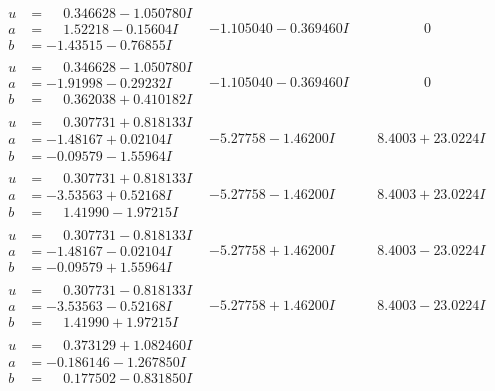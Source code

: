 \documentclass[1p]{elsarticle_modified}
\theoremstyle{definition}
\begin{document}
$$\begin{array}{c|c|c}
\begin{aligned}
u &= \phantom{-}0.346628 - 1.050780 I \\
a &= \phantom{-}1.52218 - 0.15604 I \\
b &= -1.43515 - 0.76855 I\end{aligned}
 & -1.105040 - 0.369460 I & \phantom{-0.000000 } 0 \\ \hline\begin{aligned}
u &= \phantom{-}0.346628 - 1.050780 I \\
a &= -1.91998 - 0.29232 I \\
b &= \phantom{-}0.362038 + 0.410182 I\end{aligned}
 & -1.105040 - 0.369460 I & \phantom{-0.000000 } 0 \\ \hline\begin{aligned}
u &= \phantom{-}0.307731 + 0.818133 I \\
a &= -1.48167 + 0.02104 I \\
b &= -0.09579 - 1.55964 I\end{aligned}
 & -5.27758 - 1.46200 I & \phantom{-}8.4003 + 23.0224 I \\ \hline\begin{aligned}
u &= \phantom{-}0.307731 + 0.818133 I \\
a &= -3.53563 + 0.52168 I \\
b &= \phantom{-}1.41990 - 1.97215 I\end{aligned}
 & -5.27758 - 1.46200 I & \phantom{-}8.4003 + 23.0224 I \\ \hline\begin{aligned}
u &= \phantom{-}0.307731 - 0.818133 I \\
a &= -1.48167 - 0.02104 I \\
b &= -0.09579 + 1.55964 I\end{aligned}
 & -5.27758 + 1.46200 I & \phantom{-}8.4003 - 23.0224 I \\ \hline\begin{aligned}
u &= \phantom{-}0.307731 - 0.818133 I \\
a &= -3.53563 - 0.52168 I \\
b &= \phantom{-}1.41990 + 1.97215 I\end{aligned}
 & -5.27758 + 1.46200 I & \phantom{-}8.4003 - 23.0224 I \\ \hline\begin{aligned}
u &= \phantom{-}0.373129 + 1.082460 I \\
a &= -0.186146 - 1.267850 I \\
b &= \phantom{-}0.177502 - 0.831850 I\end{aligned}

\end{array}$$
\end{document}
